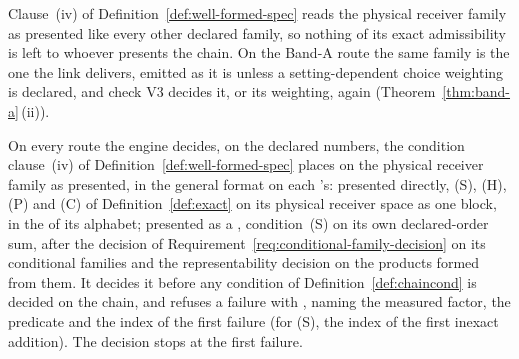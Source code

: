 
Clause~(iv) of Definition~\ref{def:well-formed-spec} reads the physical
receiver family as presented like every other declared family, so nothing
of its exact admissibility is left to whoever presents the chain. On the
Band-A route the same family is the one the link delivers, emitted as it is
unless a setting-dependent choice weighting is declared, and check V3 decides it, or its
weighting, again (Theorem~\ref{thm:band-a}\,(ii)).

\begin{requirement}\label{req:physical-family-decision}
On every route the engine decides, on the declared numbers, the condition
clause~(iv) of Definition~\ref{def:well-formed-spec} places on the physical
receiver family as presented, in the general format on each
's: presented directly, (S), (H), (P) and (C) of
Definition~\ref{def:exact} on its physical receiver space as one block, in
the  of its alphabet; presented as a
, condition~(S) on its own declared-order sum,
after the decision of Requirement~\ref{req:conditional-family-decision} on
its conditional families and the representability decision on the products
formed from them. It decides it before any condition of
Definition~\ref{def:chaincond} is decided on the chain, and refuses a failure
with , naming the measured factor, the
predicate and the index of the first failure (for (S), the index of the
first inexact addition). The decision stops at the first failure.
\end{requirement}
